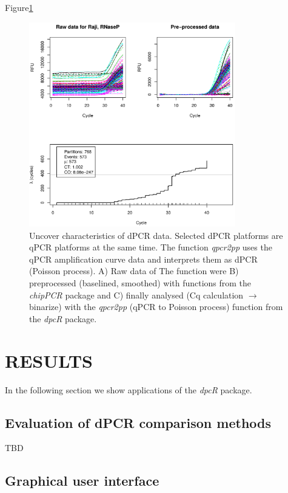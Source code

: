 \documentclass[a4,center,fleqn]{NAR}
\begin{document}
Figure\ref{qpcr2pp_1}

\begin{figure}[t]
\begin{center}
\includegraphics[width=9cm]{qpcr2pp_1.png}
\end{center}
\caption{Uncover characteristics of dPCR data. 
Selected dPCR platforms are qPCR platforms at the same time. The function \textit{qpcr2pp} uses the 
qPCR amplification curve data and interprets them as dPCR (Poisson process). A) Raw data of The 
function were B) preprocessed (baselined, smoothed) with functions from the 
\textit{chipPCR} package and C) finally analysed (Cq calculation $\rightarrow$ binarize) with the 
\textit{qpcr2pp} (qPCR to Poisson process) function from the \textit{dpcR} package.} 
\label{qpcr2pp_1}
\end{figure}

\section{RESULTS}

In the following section we show applications of the \textit{dpcR} package.

\subsection{Evaluation of dPCR comparison methods}

TBD

\subsection{Graphical user interface}
\end{document}

